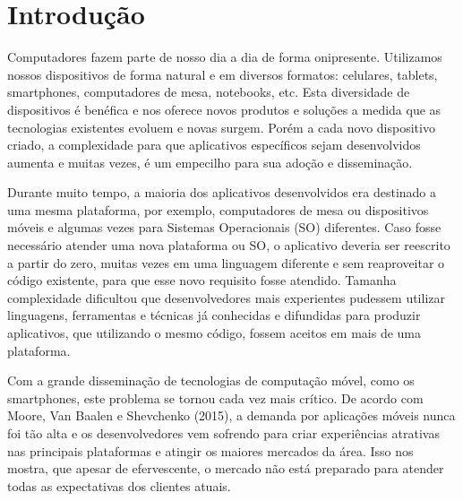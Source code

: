 \section{\esp Introdução}

Computadores fazem parte de nosso dia a dia de forma onipresente. Utilizamos nossos dispositivos de forma natural e em diversos formatos: celulares, tablets, smartphones, computadores de mesa, notebooks, etc. Esta diversidade de dispositivos é benéfica e nos oferece novos produtos e soluções a medida que as tecnologias existentes evoluem e novas surgem. Porém a cada novo dispositivo criado, a complexidade para que aplicativos específicos sejam desenvolvidos aumenta e muitas vezes, é um empecilho para sua adoção e disseminação.

Durante muito tempo, a maioria dos aplicativos desenvolvidos era destinado a uma mesma plataforma, por exemplo, computadores de mesa ou dispositivos móveis e algumas vezes para Sistemas Operacionais (SO) diferentes. Caso fosse necessário atender uma nova plataforma ou SO, o aplicativo deveria ser reescrito a partir do zero, muitas vezes em uma linguagem diferente e sem reaproveitar o código existente, para que esse novo requisito fosse atendido. Tamanha complexidade dificultou que desenvolvedores mais experientes pudessem utilizar linguagens, ferramentas e técnicas já conhecidas e difundidas para produzir aplicativos, que utilizando o mesmo código, fossem aceitos em mais de uma plataforma.

Com a grande disseminação de tecnologias de computação móvel, como os smartphones, este problema se tornou cada vez mais crítico. De acordo com Moore, Van Baalen e Shevchenko (2015), a demanda por aplicações móveis nunca foi tão alta e os desenvolvedores vem sofrendo para criar experiências atrativas nas principais plataformas e atingir os maiores mercados da área. Isso nos mostra, que apesar de efervescente, o mercado não está preparado para atender todas as expectativas dos clientes atuais.


